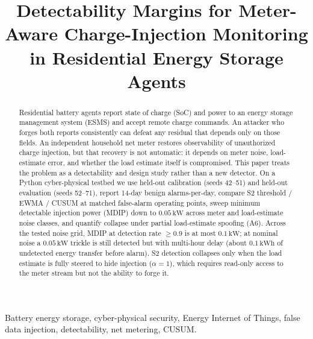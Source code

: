 \documentclass[conference]{IEEEtran}
\begin{document}
\title{Detectability Margins for Meter-Aware Charge-Injection Monitoring in Residential Energy Storage Agents}

\author{
}

\maketitle

\begin{abstract}
Residential battery agents report state of charge (SoC) and power to an energy storage management system (ESMS) and accept remote charge commands. An attacker who forges both reports consistently can defeat any residual that depends only on those fields. An independent household net meter restores observability of unauthorized charge injection, but that recovery is not automatic: it depends on meter noise, load-estimate error, and whether the load estimate itself is compromised. This paper treats the problem as a detectability and design study rather than a new detector. On a Python cyber-physical testbed we use held-out calibration (seeds 42--51) and held-out evaluation (seeds 52--71), report 14-day benign alarms-per-day, compare S2 threshold / EWMA / CUSUM at matched false-alarm operating points, sweep minimum detectable injection power (MDIP) down to $0.05\,\mathrm{kW}$ across meter and load-estimate noise classes, and quantify collapse under partial load-estimate spoofing (A6). Across the tested noise grid, MDIP at detection rate $\ge 0.9$ is at most $0.1\,\mathrm{kW}$; at nominal noise a $0.05\,\mathrm{kW}$ trickle is still detected but with multi-hour delay (about $0.1\,\mathrm{kWh}$ of undetected energy transfer before alarm). S2 detection collapses only when the load estimate is fully steered to hide injection ($\alpha=1$), which requires read-only access to the meter stream but not the ability to forge it.
\end{abstract}

\begin{IEEEkeywords}
Battery energy storage, cyber-physical security, Energy Internet of Things, false data injection, detectability, net metering, CUSUM.
\end{IEEEkeywords}
\end{document}
